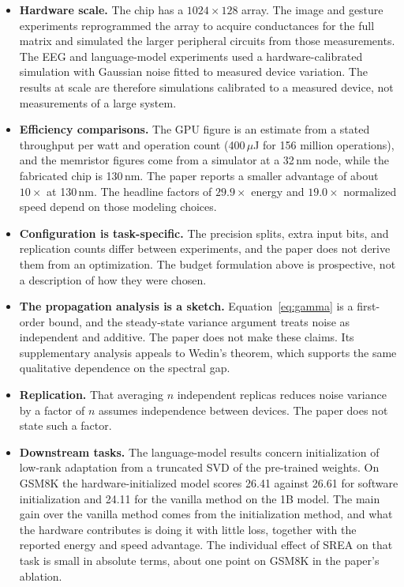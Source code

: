 \documentclass[11pt]{article}
\theoremstyle{definition}
\theoremstyle{remark}
\begin{document}
\begin{itemize}[leftmargin=1.6em,itemsep=2pt]
  \item \textbf{Hardware scale.} The chip has a $1024\times128$ array. The image and gesture experiments reprogrammed the array to acquire conductances for the full matrix and simulated the larger peripheral circuits from those measurements. The EEG and language-model experiments used a hardware-calibrated simulation with Gaussian noise fitted to measured device variation. The results at scale are therefore simulations calibrated to a measured device, not measurements of a large system.
  \item \textbf{Efficiency comparisons.} The GPU figure is an estimate from a stated throughput per watt and operation count (400\,$\mu$J for 156 million operations), and the memristor figures come from a simulator at a 32\,nm node, while the fabricated chip is 130\,nm. The paper reports a smaller advantage of about $10\times$ at 130\,nm. The headline factors of $29.9\times$ energy and $19.0\times$ normalized speed depend on those modeling choices.
  \item \textbf{Configuration is task-specific.} The precision splits, extra input bits, and replication counts differ between experiments, and the paper does not derive them from an optimization. The budget formulation above is prospective, not a description of how they were chosen.
  \item \textbf{The propagation analysis is a sketch.} Equation~\eqref{eq:gamma} is a first-order bound, and the steady-state variance argument treats noise as independent and additive. The paper does not make these claims. Its supplementary analysis appeals to Wedin's theorem, which supports the same qualitative dependence on the spectral gap.
  \item \textbf{Replication.} That averaging $n$ independent replicas reduces noise variance by a factor of $n$ assumes independence between devices. The paper does not state such a factor.
  \item \textbf{Downstream tasks.} The language-model results concern initialization of low-rank adaptation from a truncated SVD of the pre-trained weights. On GSM8K the hardware-initialized model scores 26.41 against 26.61 for software initialization and 24.11 for the vanilla method on the 1B model. The main gain over the vanilla method comes from the initialization method, and what the hardware contributes is doing it with little loss, together with the reported energy and speed advantage. The individual effect of SREA on that task is small in absolute terms, about one point on GSM8K in the paper's ablation.
\end{itemize}
\end{document}
